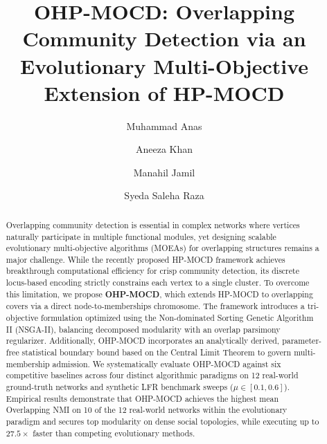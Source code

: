 \documentclass{svproc}
\begin{document}
\mainmatter

\title{OHP-MOCD: Overlapping Community Detection via an Evolutionary Multi-Objective Extension of HP-MOCD}

\author{Muhammad Anas \and Aneeza Khan \and Manahil Jamil \and Syeda Saleha Raza}


\maketitle

\begin{abstract}
Overlapping community detection is essential in complex networks where vertices naturally participate in multiple functional modules, yet designing scalable evolutionary multi-objective algorithms (MOEAs) for overlapping structures remains a major challenge. While the recently proposed HP-MOCD framework achieves breakthrough computational efficiency for crisp community detection, its discrete locus-based encoding strictly constrains each vertex to a single cluster. To overcome this limitation, we propose \textbf{OHP-MOCD}, which extends HP-MOCD to overlapping covers via a direct node-to-memberships chromosome. The framework introduces a tri-objective formulation optimized using the Non-dominated Sorting Genetic Algorithm II (NSGA-II), balancing decomposed modularity with an overlap parsimony regularizer. Additionally, OHP-MOCD incorporates an analytically derived, parameter-free statistical boundary bound based on the Central Limit Theorem to govern multi-membership admission. We systematically evaluate OHP-MOCD against six competitive baselines across four distinct algorithmic paradigms on 12 real-world ground-truth networks and synthetic LFR benchmark sweeps ($\mu \in [0.1, 0.6]$). Empirical results demonstrate that OHP-MOCD achieves the highest mean Overlapping NMI on 10 of the 12 real-world networks within the evolutionary paradigm and secures top modularity on dense social topologies, while executing up to $27.5\times$ faster than competing evolutionary methods.
\end{abstract}

\end{document}
